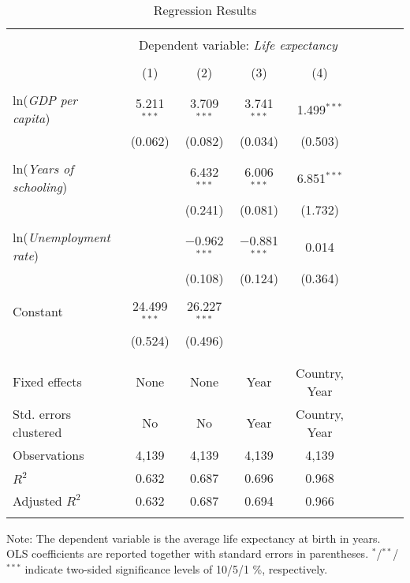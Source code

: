 \documentclass[a4paper]{article}
\begin{document}
\begin{center}
\begin{table}[!htbp]
\caption{\label{tab:regression_results}Regression Results}
\centering
\small
\begin{threeparttable}
\setlength{\tabcolsep}{2pt}
\begin{tabular}{lcccccccc}
\\[-1.8ex]\hline 
\hline \\[-1.8ex] 
 & \multicolumn{4}{c}{Dependent variable: \textit{Life expectancy}} \\ 
\cline{2-5} 
\\[-1.8ex] & (1) & (2) & (3) & (4)\\ 
\hline \\[-1.8ex] 
 ln(\textit{GDP per capita}) & 5.211$^{***}$ & 3.709$^{***}$ & 3.741$^{***}$ & 1.499$^{***}$ \\ 
  & (0.062) & (0.082) & (0.034) & (0.503) \\ 
  & & & & \\ 
 ln(\textit{Years of schooling}) &  & 6.432$^{***}$ & 6.006$^{***}$ & 6.851$^{***}$ \\ 
  &  & (0.241) & (0.081) & (1.732) \\ 
  & & & & \\ 
 ln(\textit{Unemployment rate}) &  & $-$0.962$^{***}$ & $-$0.881$^{***}$ & 0.014 \\ 
  &  & (0.108) & (0.124) & (0.364) \\ 
  & & & & \\ 
 Constant & 24.499$^{***}$ & 26.227$^{***}$ &  &  \\ 
  & (0.524) & (0.496) &  &  \\ 
  & & & & \\ 
\hline \\[-1.8ex] 
Fixed effects & None & None & Year & Country, Year \\ 
Std. errors clustered & No & No & Year & Country, Year \\ 
Observations & 4,139 & 4,139 & 4,139 & 4,139 \\ 
$R^{2}$ & 0.632 & 0.687 & 0.696 & 0.968 \\ 
Adjusted $R^{2}$ & 0.632 & 0.687 & 0.694 & 0.966 \\ 
\hline 
\hline \\[-1.8ex] 
\end{tabular}
\begin{tablenotes}[flushleft]
\setlength{\labelsep}{0pt}
\footnotetext
\item Note: The dependent variable is the average life expectancy at birth in 
years. OLS coefficients are reported together with standard errors in 
parentheses. $^{*}$/$^{**}$/$^{***}$ indicate two-sided significance levels 
of 10/5/1 \%, respectively.
\end{tablenotes}
\end{threeparttable}
\end{table}
\end{center}
\end{document}
